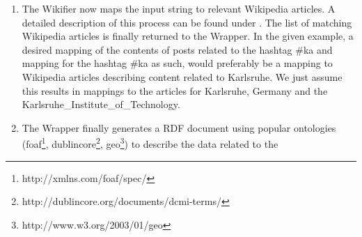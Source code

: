 \documentclass{llncs}
\begin{document}
\begin{enumerate}
The Wrapper now calls the Wikifier (see \cite{key:wikifier}). Content of
the Twitter messages that matched the search query and optional content of their
referenced websites is merged to a single input string which is used as input for the Wikifier. The service
returns a list of matching articles of the English
Wikipedia. Optionally the wrapper can be initially called with attribute lang=de
to trigger mapping to the German Wikipedia.\newline\linebreak
In the given example, content of all posts related to the search term '\#ka' is
merged with retrieved external website content. Taking a closer look at the
single post we merge its content and content of its referenced website to
a single string:\newline\linebreak
\texttt{Just returned from a wonderful holiday in \#ka.
\url{http://www.karlsruhe.de/stadt/tourismus.en} @KarlsruheTweets. Karlsruhe,
where paths converge - a legendary city in the sunny\newline south-west of
Germany, famed for its fan-shaped historic street plan, where margraves\newline
reigned in times past, and German joie de vivre reigns today.}\newline\linebreak
This string is appended to Twitter content and external content of all other
posts that have been retrieved in this way matching the initial query \#ka and
used as input for the Wikifier.\newline
  \item
The Wikifier now maps the input string to relevant Wikipedia articles. A
detailed description of this process can be found under \cite{key:wikifier}. 
The list of matching Wikipedia articles is finally returned to the
Wrapper.\newline\linebreak
In the given example, a desired mapping of the contents of posts related to the
hashtag \#ka and mapping for the hashtag \#ka as such, would preferably be a
mapping to Wikipedia articles describing content related to Karlsruhe. We just
assume this results in mappings to the articles for Karlsruhe, Germany and the
Karlsruhe\_Institute\_of\_Technology.\newline
  \item
The Wrapper finally generates a RDF document using popular ontologies
(foaf\footnote{http://xmlns.com/foaf/spec/},
dublincore\footnote{http://dublincore.org/documents/dcmi-terms/}, geo\footnote{http://www.w3.org/2003/01/geo}) to describe the data related to the

\end{enumerate}
\end{document}
